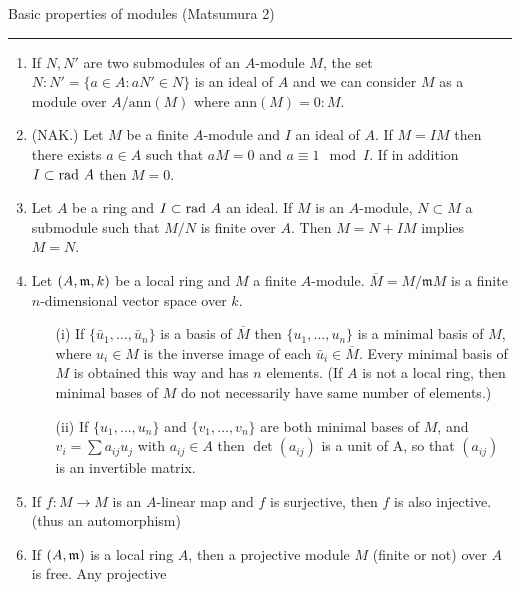 \begin{notes}
      Basic properties of modules (Matsumura 2)
\end{notes}
\hrule

\begin{enumerate}
      \item
            If $N,N'$ are two submodules of an $A$-module $M$, the set $N:N'=\{a\in A: aN'\in N \}$ is an
            ideal of $A$ and we can consider $M$ as a module over $A/\text{ann}(M)$ where ann$(M)=0:M$.
            
      \item (NAK.)
            Let $M$ be a finite $A$-module and $I$ an ideal of $A$. If $M=IM$ then there exists $a\in A$ such that
            $aM=0$ and $a\equiv 1\mod{I}.$ If in addition $I\subset \text{rad }{A}$ then $M=0$.
      \item
            Let $A$ be a ring and $I\subset \text{rad }{A}$ an ideal. If $M$ is an $A$-module, $N\subset M$ a submodule such
            that $M/N$ is finite over $A$. Then $M=N+IM$ implies $M=N$.
      \item
            Let $(A,\mathfrak{m},k)$ be a local ring and $M$ a finite $A$-module. $\overbar{M}=M/\mathfrak{m}M$ is a
            finite $n$-dimensional vector space over $k$.
            \begin{enumerate}
                  \item[(i)]
                        If $\{\bar{u}_1,\ldots,\bar{u}_n\}$ is a basis of $\overbar{M}$ then $\{u_1,\ldots,u_n\}$
                        is a minimal basis of $M$, where $u_i\in M$ is the inverse image of each $\bar{u}_i\in\overbar{M}$.
                        Every minimal basis of $M$ is obtained this way and has $n$ elements. (If $A$ is not a local ring,
                        then minimal bases of $M$ do not necessarily have same number of elements.)
                  \item[(ii)]
                        If $\{u_1,\ldots,u_n\}$ and $\{v_1,\ldots,v_n\}$ are both minimal bases of $M$, and
                        $v_i=\sum{a_{ij}u_j}$ with $a_{ij}\in A$ then $\det{(a_{ij})}$ is a unit of A, so that $(a_{ij})$ is an
                        invertible matrix.
            \end{enumerate}
      \item
            If $f:M \to M$ is an $A$-linear map and $f$ is surjective, then $f$ is also injective. (thus an automorphism)
      \item
            If $(A,\mathfrak{m})$ is a local ring $A$, then a projective module $M$ (finite or not) over $A$ is free. Any projective

\end{enumerate}
